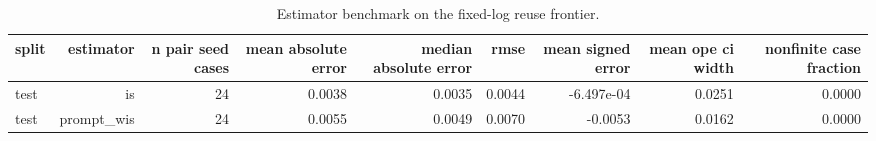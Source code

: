 \begin{table}[t]
\centering
\small
\caption{Estimator benchmark on the fixed-log reuse frontier.}
\label{tab:estimator\_benchmark}
\begin{tabular}{lrrrrrrrr}
\toprule
split & estimator & n pair seed cases & mean absolute error & median absolute error & rmse & mean signed error & mean ope ci width & nonfinite case fraction \\
\midrule
test & is & 24 & 0.0038 & 0.0035 & 0.0044 & -6.497e-04 & 0.0251 & 0.0000 \\
test & prompt\_wis & 24 & 0.0055 & 0.0049 & 0.0070 & -0.0053 & 0.0162 & 0.0000 \\
\bottomrule
\end{tabular}
\end{table}
